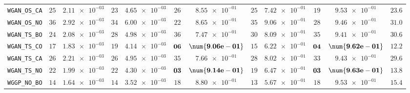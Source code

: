 \begin{table}[H]
\begin{tabularx}{\textwidth}{l||cC|cC|cC|cC|cC||c}
		\texttt{WGAN\_OS\_CA} & $ 25$ & $ \num{2.11e-03}$ & $ 23$ & $ \num{4.65e-03}$ & $ 26$ & $ \num{8.55e-01}$ & $ 25$ & $ \num{7.42e-01}$ & $ 19$ & $ \num{9.53e-01}$ & $ 23.6$  \\
		\texttt{WGAN\_OS\_NO} & $ 36$ & $ \num{2.92e-03}$ & $ 34$ & $ \num{6.00e-03}$ & $ 22$ & $ \num{8.65e-01}$ & $ 35$ & $ \num{9.06e-01}$ & $ 28$ & $ \num{9.46e-01}$ & $ 31.0$  \\
		\texttt{WGAN\_TS\_BO} & $ 24$ & $ \num{2.08e-03}$ & $ 28$ & $ \num{4.98e-03}$ & $ 36$ & $ \num{7.47e-01}$ & $ 30$ & $ \num{8.09e-01}$ & $ 35$ & $ \num{9.41e-01}$ & $ 30.6$  \\
		\texttt{WGAN\_TS\_CO} & $ 17$ & $ \num{1.83e-03}$ & $ 19$ & $ \num{4.14e-03}$ & $\bf 06$ & $\bf \num{9.06e-01}$ & $ 15$ & $ \num{6.22e-01}$ & $\bf 04$ & $\bf \num{9.62e-01}$ & $ 12.2$  \\
		\texttt{WGAN\_TS\_CA} & $ 26$ & $ \num{2.21e-03}$ & $ 26$ & $ \num{4.95e-03}$ & $ 35$ & $ \num{7.66e-01}$ & $ 28$ & $ \num{8.02e-01}$ & $ 33$ & $ \num{9.43e-01}$ & $ 29.6$  \\
		\texttt{WGAN\_TS\_NO} & $ 22$ & $ \num{1.99e-03}$ & $ 22$ & $ \num{4.30e-03}$ & $\bf 03$ & $\bf \num{9.14e-01}$ & $ 19$ & $ \num{6.47e-01}$ & $\bf 03$ & $\bf \num{9.63e-01}$ & $ 13.8$  \\ \hline
		\texttt{WGGP\_NO\_BO} & $ 14$ & $ \num{1.64e-03}$ & $ 14$ & $ \num{3.52e-03}$ & $ 18$ & $ \num{8.80e-01}$ & $ 13$ & $ \num{5.67e-01}$ & $ 18$ & $ \num{9.53e-01}$ & $ 15.4$  \\

\end{tabularx}
\end{table}
